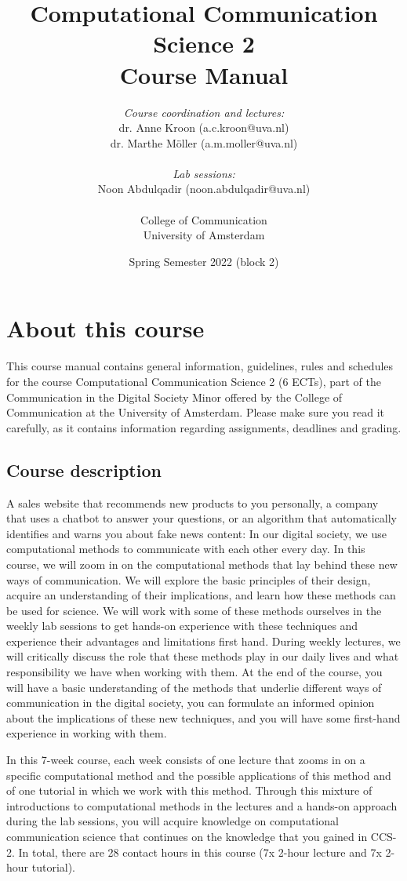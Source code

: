 \documentclass[a4paper,10pt,twocolumn]{report}
\title{Computational Communication Science 2\\ Course Manual}
\author{\emph{Course coordination and lectures:}\\ dr. Anne Kroon (a.c.kroon@uva.nl)\\dr. Marthe Möller (a.m.moller@uva.nl) \\ \\ \emph{Lab sessions:} \\Noon Abdulqadir (noon.abdulqadir@uva.nl) \\~\\College of Communication\\University of Amsterdam}
\date{Spring Semester 2022 (block 2)}
\begin{document}
	\maketitle
	
	\tableofcontents

	
	\chapter{About this course}
	
	This course manual contains general information, guidelines, rules and schedules for the course Computational Communication Science 2 (6 ECTs), part of the Communication in the Digital Society Minor offered by the College of Communication at the University of Amsterdam. Please make sure you read it carefully, as it  contains information regarding assignments, deadlines and grading.
	
	\section{Course description}
	
	A sales website that recommends new products to you personally, a company that uses a chatbot to answer your questions, or an algorithm that automatically identifies and warns you about fake news content: In our digital society, we use computational methods to communicate with each other every day. In this course, we will zoom in on the computational methods that lay behind these new ways of communication. We will explore the basic principles of their design, acquire an understanding of their implications, and learn how these methods can be used for science. We will work with some of these methods ourselves in the weekly lab sessions to get hands-on experience with these techniques and experience their advantages and limitations first hand. During weekly lectures, we will critically discuss the role that these methods play in our daily lives and what responsibility we have when working with them. At the end of the course, you will have a basic understanding of the methods that underlie different ways of communication in the digital society, you can formulate an informed opinion about the implications of these new techniques, and you will have some first-hand experience in working with them.
	
	In this 7-week course, each week consists of one lecture that zooms in on a specific computational method and the possible applications of this method and of one tutorial in which we work with this method. Through this mixture of introductions to computational methods in the lectures and a hands-on approach during the lab sessions, you will acquire knowledge on computational communication science that continues on the knowledge that you gained in CCS-2. In total, there are 28 contact hours in this course (7x 2-hour lecture and 7x 2-hour tutorial). 
	
\end{document}
